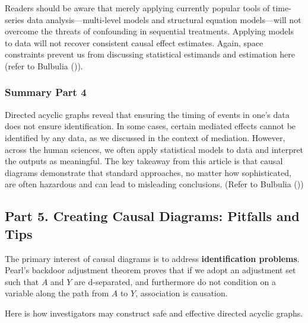\documentclass[
  single column]{article}
\begin{document}
Readers should be aware that merely applying currently popular tools of
time-series data analysis---multi-level models and structural equation
models---will not overcome the threats of confounding in sequential
treatments. Applying models to data will not recover consistent causal
effect estimates. Again, space constraints prevent us from discussing
statistical estimands and estimation here (refer to Bulbulia
()).

\subsubsection{Summary Part 4}\label{summary-part-4}

Directed acyclic graphs reveal that ensuring the timing of events in
one's data does not ensure identification. In some cases, certain
mediated effects cannot be identified by any data, as we discussed in
the context of mediation. However, across the human sciences, we often
apply statistical models to data and interpret the outputs as
meaningful. The key takeaway from this article is that causal diagrams
demonstrate that standard approaches, no matter how sophisticated, are
often hazardous and can lead to misleading conclusions. (Refer to
Bulbulia ())

\subsection{Part 5. Creating Causal Diagrams: Pitfalls and
Tips}\label{id-sec-5}

The primary interest of causal diagrams is to address
\textbf{identification problems}. Pearl's backdoor adjustment theorem
proves that if we adopt an adjustment set such that \(A\) and \(Y\) are
d-separated, and furthermore do not condition on a variable along the
path from \(A\) to \(Y\), association is causation.

Here is how investigators may construct safe and effective directed
acyclic graphs.
\end{document}
